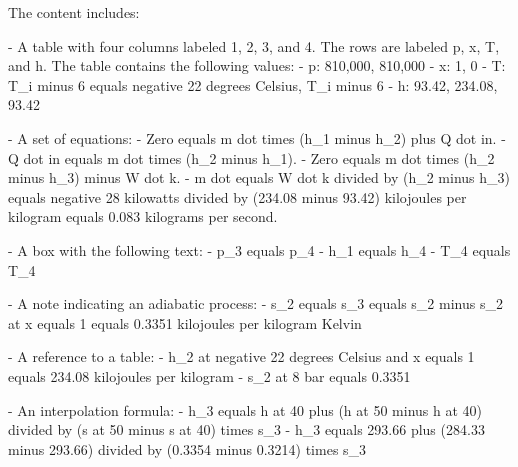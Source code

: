 The content includes:

- A table with four columns labeled 1, 2, 3, and 4. The rows are labeled p, x, T, and h. The table contains the following values:
  - p: 810,000, 810,000
  - x: 1, 0
  - T: T_i minus 6 equals negative 22 degrees Celsius, T_i minus 6
  - h: 93.42, 234.08, 93.42

- A set of equations:
  - Zero equals m dot times (h_1 minus h_2) plus Q dot in.
  - Q dot in equals m dot times (h_2 minus h_1).
  - Zero equals m dot times (h_2 minus h_3) minus W dot k.
  - m dot equals W dot k divided by (h_2 minus h_3) equals negative 28 kilowatts divided by (234.08 minus 93.42) kilojoules per kilogram equals 0.083 kilograms per second.

- A box with the following text:
  - p_3 equals p_4
  - h_1 equals h_4
  - T_4 equals T_4

- A note indicating an adiabatic process:
  - s_2 equals s_3 equals s_2 minus s_2 at x equals 1 equals 0.3351 kilojoules per kilogram Kelvin

- A reference to a table:
  - h_2 at negative 22 degrees Celsius and x equals 1 equals 234.08 kilojoules per kilogram
  - s_2 at 8 bar equals 0.3351

- An interpolation formula:
  - h_3 equals h at 40 plus (h at 50 minus h at 40) divided by (s at 50 minus s at 40) times s_3
  - h_3 equals 293.66 plus (284.33 minus 293.66) divided by (0.3354 minus 0.3214) times s_3